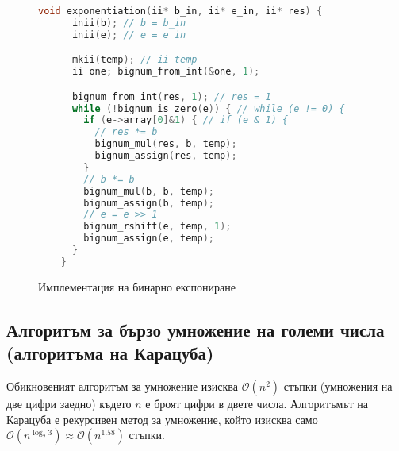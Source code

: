   \begin{figure}[ht]
    \caption{Имплементация на бинарно експониране}
    \label{fig:binexp}
    \begin{lstlisting}[language=C]
    void exponentiation(ii* b_in, ii* e_in, ii* res) {
      inii(b); // b = b_in
      inii(e); // e = e_in

      mkii(temp); // ii temp
      ii one; bignum_from_int(&one, 1);

      bignum_from_int(res, 1); // res = 1
      while (!bignum_is_zero(e)) { // while (e != 0) {
        if (e->array[0]&1) { // if (e & 1) {
          // res *= b
          bignum_mul(res, b, temp);
          bignum_assign(res, temp);
        }
        // b *= b
        bignum_mul(b, b, temp);
        bignum_assign(b, temp);
        // e = e >> 1
        bignum_rshift(e, temp, 1);
        bignum_assign(e, temp);
      }
    }
    \end{lstlisting}
  \end{figure}

  \subsection{Алгоритъм за бързо умножение на големи числа (алгоритъма на Карацуба)} \label{karatsuba}
  Обикновеният алгоритъм за умножение изисква $\mathcal{O}(n^2)$ стъпки (умножения на две цифри заедно) където $n$ е броят цифри в двете числа. Алгоритъмът на Карацуба е рекурсивен метод за умножение, който изисква само $\mathcal{O}(n^{\log_2 3}) \approx \mathcal{O}(n^{1.58})$ стъпки.

